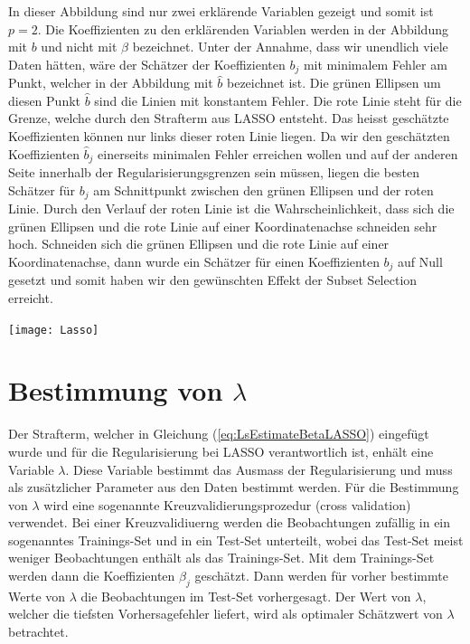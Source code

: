 \documentclass[]{book}
\begin{document}
In dieser Abbildung sind nur zwei erklärende Variablen gezeigt und somit
ist \(p=2\). Die Koeffizienten zu den erklärenden Variablen werden in
der Abbildung mit \(b\) und nicht mit \(\beta\) bezeichnet. Unter der
Annahme, dass wir unendlich viele Daten hätten, wäre der Schätzer der
Koeffizienten \(b_j\) mit minimalem Fehler am Punkt, welcher in der
Abbildung mit \(\hat{b}\) bezeichnet ist. Die grünen Ellipsen um diesen
Punkt \(\hat{b}\) sind die Linien mit konstantem Fehler. Die rote Linie
steht für die Grenze, welche durch den Strafterm aus LASSO entsteht. Das
heisst geschätzte Koeffizienten können nur links dieser roten Linie
liegen. Da wir den geschätzten Koeffizienten \(\hat{b}_j\) einerseits
minimalen Fehler erreichen wollen und auf der anderen Seite innerhalb
der Regularisierungsgrenzen sein müssen, liegen die besten Schätzer für
\(b_j\) am Schnittpunkt zwischen den grünen Ellipsen und der roten
Linie. Durch den Verlauf der roten Linie ist die Wahrscheinlichkeit,
dass sich die grünen Ellipsen und die rote Linie auf einer
Koordinatenachse schneiden sehr hoch. Schneiden sich die grünen Ellipsen
und die rote Linie auf einer Koordinatenachse, dann wurde ein Schätzer
für einen Koeffizienten \(b_j\) auf Null gesetzt und somit haben wir den
gewünschten Effekt der Subset Selection erreicht.

\begin{center}\texttt{[image: Lasso]} \end{center}

\section{\texorpdfstring{Bestimmung von
\(\lambda\)}{Bestimmung von \textbackslash{}lambda}}\label{bestimmung-von-lambda}

Der Strafterm, welcher in Gleichung (\ref{eq:LsEstimateBetaLASSO})
eingefügt wurde und für die Regularisierung bei LASSO verantwortlich
ist, enhält eine Variable \(\lambda\). Diese Variable bestimmt das
Ausmass der Regularisierung und muss als zusätzlicher Parameter aus den
Daten bestimmt werden. Für die Bestimmung von \(\lambda\) wird eine
sogenannte Kreuzvalidierungsprozedur (cross validation) verwendet. Bei
einer Kreuzvalidiuerng werden die Beobachtungen zufällig in ein
sogenanntes Trainings-Set und in ein Test-Set unterteilt, wobei das
Test-Set meist weniger Beobachtungen enthält als das Trainings-Set. Mit
dem Trainings-Set werden dann die Koeffizienten \(\beta_j\) geschätzt.
Dann werden für vorher bestimmte Werte von \(\lambda\) die Beobachtungen
im Test-Set vorhergesagt. Der Wert von \(\lambda\), welcher die tiefsten
Vorhersagefehler liefert, wird als optimaler Schätzwert von \(\lambda\)
betrachtet.
\end{document}
